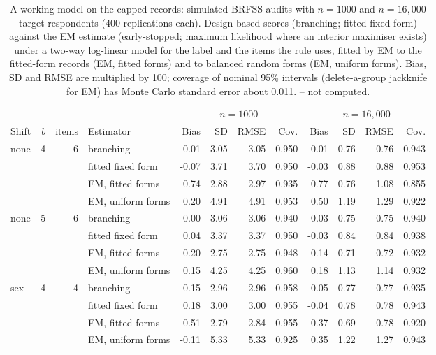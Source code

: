 \begin{table}[h]
\centering
\caption{A working model on the capped records: simulated BRFSS audits with $n=1000$ and $n=16,000$ target respondents (400 replications each). Design-based scores (branching; fitted fixed form) against the EM estimate (early-stopped; maximum likelihood where an interior maximiser exists) under a two-way log-linear model for the label and the items the rule uses, fitted by EM to the fitted-form records (EM, fitted forms) and to balanced random forms (EM, uniform forms). Bias, SD and RMSE are multiplied by 100; coverage of nominal 95\% intervals (delete-a-group jackknife for EM) has Monte Carlo standard error about 0.011. -- not computed.}
\label{tab:em}
\scriptsize
\setlength{\tabcolsep}{2.8pt}
\begin{tabular}{lrrlrrrrrrrr}
\toprule
 & & & & \multicolumn{4}{c}{$n=1000$} & \multicolumn{4}{c}{$n=16,000$} \\
Shift & $b$ & items & Estimator & Bias & SD & RMSE & Cov. & Bias & SD & RMSE & Cov. \\
\midrule
none & 4 & 6 & branching & -0.01 & 3.05 & 3.05 & 0.950 & -0.01 & 0.76 & 0.76 & 0.943 \\
 &  &  & fitted fixed form & -0.07 & 3.71 & 3.70 & 0.950 & -0.03 & 0.88 & 0.88 & 0.953 \\
 &  &  & EM, fitted forms & 0.74 & 2.88 & 2.97 & 0.935 & 0.77 & 0.76 & 1.08 & 0.855 \\
 &  &  & EM, uniform forms & 0.20 & 4.91 & 4.91 & 0.953 & 0.50 & 1.19 & 1.29 & 0.922 \\
none & 5 & 6 & branching & 0.00 & 3.06 & 3.06 & 0.940 & -0.03 & 0.75 & 0.75 & 0.940 \\
 &  &  & fitted fixed form & 0.04 & 3.37 & 3.37 & 0.950 & -0.03 & 0.84 & 0.84 & 0.938 \\
 &  &  & EM, fitted forms & 0.20 & 2.75 & 2.75 & 0.948 & 0.14 & 0.71 & 0.72 & 0.932 \\
 &  &  & EM, uniform forms & 0.15 & 4.25 & 4.25 & 0.960 & 0.18 & 1.13 & 1.14 & 0.932 \\
sex & 4 & 4 & branching & 0.15 & 2.96 & 2.96 & 0.958 & -0.05 & 0.77 & 0.77 & 0.935 \\
 &  &  & fitted fixed form & 0.18 & 3.00 & 3.00 & 0.955 & -0.04 & 0.78 & 0.78 & 0.943 \\
 &  &  & EM, fitted forms & 0.51 & 2.79 & 2.84 & 0.955 & 0.37 & 0.69 & 0.78 & 0.920 \\
 &  &  & EM, uniform forms & -0.11 & 5.33 & 5.33 & 0.925 & 0.35 & 1.22 & 1.27 & 0.943 \\

\end{tabular}
\end{table}
